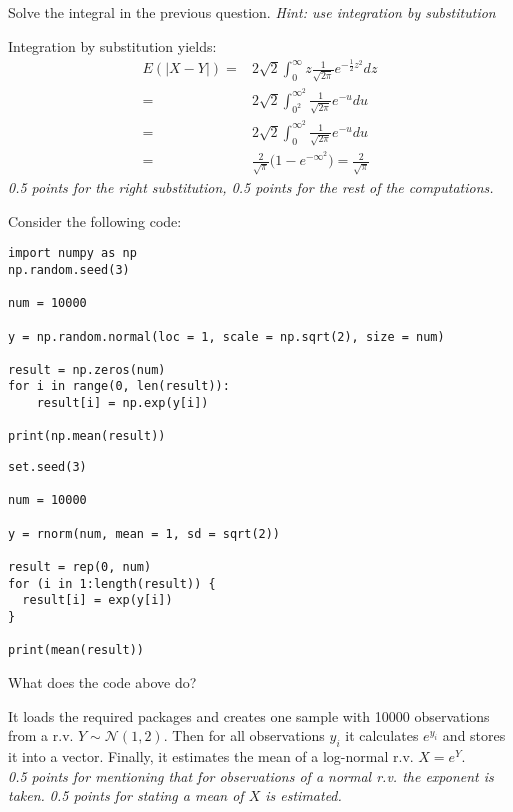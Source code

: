 \begin{exercise}[1]
Solve the integral in the previous question. \textit{Hint: use integration by substitution}
\begin{solution}
Integration by substitution yields:
\begin{align*}
    E(|X-Y|) =& 2\sqrt{2} \int_{0}^\infty z \frac{1}{\sqrt{2 \pi}} e^{-\frac{1}{2}z^2} dz \\
    =& 2 \sqrt{2} \int_{0^2}^{\infty^2} \frac{1}{\sqrt{2 \pi}} e^{-u} du \\
    =& 2 \sqrt{2} \int_{0}^{\infty^2} \frac{1}{\sqrt{2 \pi}} e^{-u} du\\
    =& \frac{2}{\sqrt{\pi}} \Big(1-e^{-\infty^2} \Big) = \frac{2}{\sqrt{\pi}}
\end{align*}
\textit{0.5 points for the right substitution, 0.5 points for the rest of the computations.}
\end{solution}
\end{exercise}

\noindent Consider the following code:
\begin{verbatim}
import numpy as np
np.random.seed(3)

num = 10000

y = np.random.normal(loc = 1, scale = np.sqrt(2), size = num)

result = np.zeros(num)
for i in range(0, len(result)):
    result[i] = np.exp(y[i])

print(np.mean(result))
\end{verbatim}

\begin{verbatim}
set.seed(3)

num = 10000

y = rnorm(num, mean = 1, sd = sqrt(2))

result = rep(0, num)
for (i in 1:length(result)) {
  result[i] = exp(y[i])
}

print(mean(result))
\end{verbatim}

\begin{exercise}[1]
What does the code above do?
\begin{solution}
It loads the required packages and creates one sample with 10000 observations from a r.v. $Y \sim \mathcal{N}(1, 2)$. Then for all observations $y_i$ it calculates $e^{y_i}$ and stores it into a vector. Finally, it estimates the mean of a log-normal r.v. $X = e^Y$. \\
\textit{0.5 points for mentioning that for observations of a normal r.v. the exponent is taken. 0.5 points for stating a mean of $X$ is estimated.}
\end{solution}
\end{exercise}

